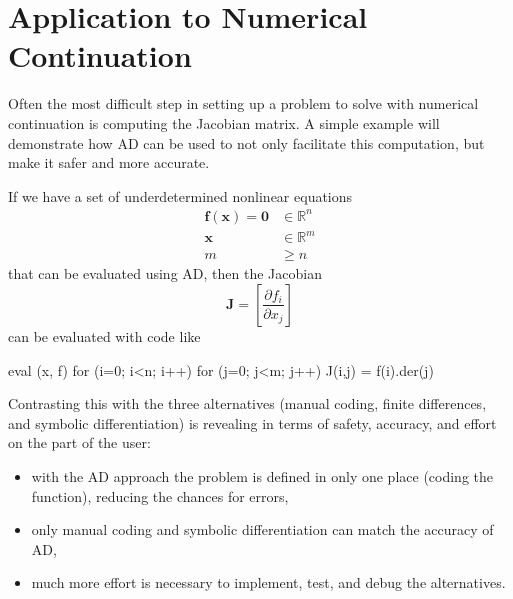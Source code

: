 \documentclass[10pt,openany,twoside]{book}
\numberwithin{equation}{section}   %
\newcommand{\Matrix}[1]{\boldsymbol{#1}}
\newcommand{\Vector}[1]{\boldsymbol{#1}}
\begin{document}
\section{Application to Numerical Continuation}\label{sect:AD-impl}
Often the most difficult step in setting up a problem to solve
with numerical continuation is computing the Jacobian matrix.
A simple example will demonstrate how AD can be used to not only
facilitate this computation, but make it safer and more accurate.

If we have a set of underdetermined nonlinear equations
\begin{align}
\Vector{f}(\Vector{x}) = \Vector{0} & \in \mathbb{R}^{n} \nonumber \\
\Vector{x} & \in \mathbb{R}^{m} \nonumber \\
m & \ge n	\nonumber
\end{align}
that can be evaluated using AD, then the Jacobian
\begin{displaymath}
\Matrix{J} = \left[ \frac{\partial f_i}{\partial x_j} \right]
\end{displaymath}
can be evaluated with code like
\begin{example}
   eval (x, f)
   for (i=0; i<n; i++)
      for (j=0; j<m; j++)
         J(i,j) = f(i).der(j)
\end{example}
Contrasting this with the three alternatives (manual coding, finite
differences, and symbolic differentiation) is revealing in terms of
safety, accuracy, and effort on the part of the user:
\begin{itemize}
	\item with the AD approach the problem is defined in only one place (coding
		the function), reducing the chances for errors,
	\item only manual coding and symbolic differentiation can match the accuracy
		of AD,
	\item much more effort is necessary to implement, test, and debug the
		alternatives.
\end{itemize}

\end{document}
